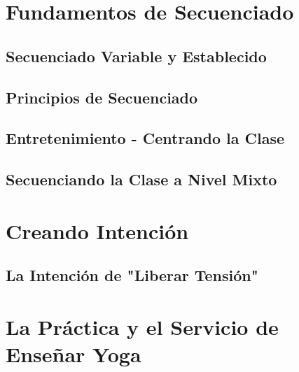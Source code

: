 \section{Fundamentos de Secuenciado}
\subsection{Secuenciado Variable y Establecido}
\subsection{Principios de Secuenciado}
\subsection{Entretenimiento - Centrando la Clase}
\subsection{Secuenciando la Clase a Nivel Mixto}
\section{Creando Intención}
\subsection{La Intención de "Liberar Tensión"}
\section{La Práctica y el Servicio de Enseñar Yoga}


